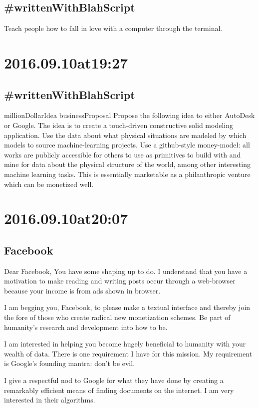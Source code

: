 \begin{enumerate}
\begin{enumerate}
\subsection*{ #writtenWithBlahScript }
Teach people how to fall in love with a computer through the terminal.

\section*{ 2016.09.10at19:27 }
\subsection*{ #writtenWithBlahScript }
millionDollarIdea businessProposal Propose the following idea to either AutoDesk or Google. The idea is to create a touch-driven constructive solid modeling application. Use the data about what physical situations are madeled by which models to source machine-learning projects. Use a github-style money-model: all works are publicly accessible for others to use as primitives to build with and mine for data about the physical structure of the world, among other interesting machine learning tasks. This is essentially marketable as a philanthropic venture which can be monetized well.

\section*{ 2016.09.10at20:07 }
\subsection*{ Facebook }
Dear Facebook,
You have some shaping up to do. I understand that you have a motivation to make reading and writing posts occur through a web-browser because your income is from ads shown in browser.

I am begging you, Facebook, to please make a textual interface and thereby join the fore of those who create radical new monetization schemes. Be part of humanity's research and development into how to be.

I am interested in helping you become hugely beneficial to humanity with your wealth of data. There is one requirement I have for this mission. My requirement is Google's founding mantra: don't be evil.

I give a respectful nod to Google for what they have done by creating a remarkably efficient means of finding documents on the internet. I am very interested in their algorithms.


\end{enumerate}
\end{enumerate}
